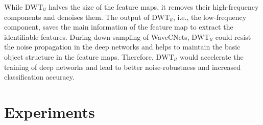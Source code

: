 \documentclass[10pt,twocolumn,letterpaper]{article}
\begin{document}
While $\text{DWT}_{ll}$ halves the size of the feature maps,
it removes their high-frequency components and denoises them.
The output of $\text{DWT}_{ll}$, i.e., the low-frequency component, saves the main information of the feature map
to extract the identifiable features.
During down-sampling of WaveCNets, $\text{DWT}_{ll}$ could resist the noise propagation in the deep networks
and helps to maintain the basic object structure in the feature maps.
Therefore, $\text{DWT}_{ll}$ would accelerate the training of deep networks and
lead to better noise-robustness and increased classification accuracy.

\section{Experiments}
\end{document}
